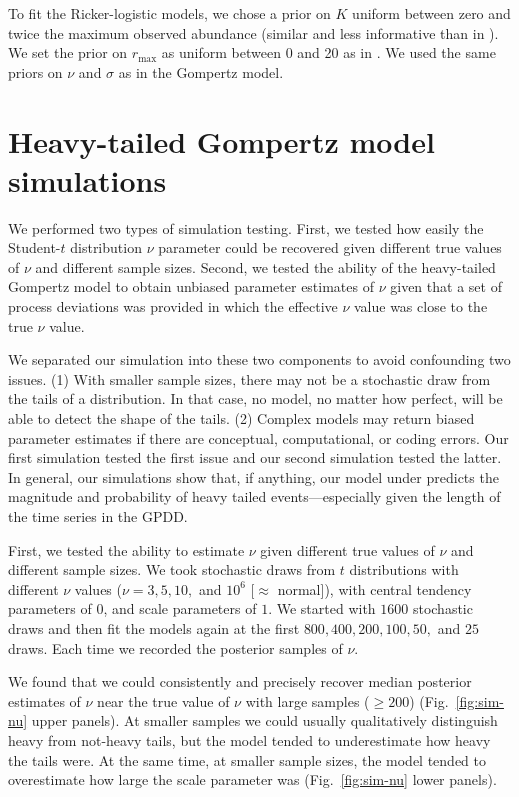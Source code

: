 \documentclass[12pt]{article}
\begin{document}
To fit the Ricker-logistic models, we chose a prior on \(K\) uniform between
zero and twice the maximum observed abundance (similar and less informative
than in \citet{delean2013}). We set the prior on
\(r_\mathrm{max}\) as uniform between 0 and 20 as in \citet{delean2013}. 
We used the same priors on \(\nu\) and \(\sigma\) as in
the Gompertz model.


\section{Heavy-tailed Gompertz model simulations}

We performed two types of simulation testing.
First, we tested how easily the Student-$t$ distribution \(\nu\) parameter could
be recovered given different true values of \(\nu\) and different sample sizes.
Second, we tested the ability of the heavy-tailed Gompertz model to obtain
unbiased parameter estimates of \(\nu\) given that a set of process deviations
was provided in which the effective \(\nu\) value was close to the true \(\nu\)
value.

We separated our simulation into these two components to avoid confounding two
issues. (1) With smaller sample sizes, there may not be a stochastic draw from
the tails of a distribution. In that case, no model, no matter how perfect,
will be able to detect the shape of the tails. (2) Complex models may return
biased parameter estimates if there are conceptual, computational, or coding
errors. Our first simulation tested the first issue and our second simulation
tested the latter. In general, our simulations show that, if anything, our
model under predicts the magnitude and probability of heavy tailed
events---especially given the length of the time series in the GPDD.

First, we tested the ability to estimate $\nu$ given different true values of
$\nu$ and different sample sizes. We took stochastic draws from $t$
distributions with different $\nu$ values ($\nu = 3, 5, 10,$ and $10^6$
[$\approx$ normal]), with central tendency parameters of $0$, and scale
parameters of $1$. We started with $1600$ stochastic draws and then fit the
models again at the first $800, 400, 200, 100, 50,$ and $25$ draws. Each time
we recorded the posterior samples of $\nu$.

We found that we could consistently and precisely recover median posterior
estimates of \(\nu\) near the true value of \(\nu\) with large samples (\(\ge
200\)) (Fig.~\ref{fig:sim-nu} upper panels). At smaller samples we could
usually qualitatively distinguish heavy from not-heavy tails, but the model
tended to underestimate how heavy the tails were. At the same time, at smaller
sample sizes, the model tended to overestimate how large the scale parameter
was (Fig.~\ref{fig:sim-nu} lower panels).
\end{document}
